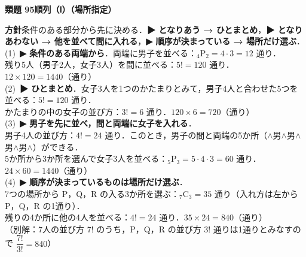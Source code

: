 \documentclass[a4paper,11pt]{ltjsarticle}
\newcommand{\ans}[2]{\Needspace{5\baselineskip}\vspace{6pt}%
  {\sffamily\bfseries 類題 #1\quad #2}\par}
\newcommand{\point}[1]{\textsf{\bfseries ▶ #1}}
\begin{document}
\ans{95}{順列（Ⅰ）（場所指定）}
\begin{kai}
\textbf{方針}\quad 条件のある部分から先に決める．\point{となりあう → ひとまとめ}，\point{となりあわない → 他を並べて間に入れる}，\point{順序が決まっている → 場所だけ選ぶ}．\\[2pt]
(1)\ \point{条件のある両端から}．両端に男子を並べる：${}_4\mathrm P_2=4\cdot3=12$ 通り．\\
\hspace*{1.5em}残り5人（男子2人，女子3人）を間に並べる：$5!=120$ 通り．\\
\hspace*{1.5em}$12\times120=1440$（通り）\\[2pt]
(2)\ \point{ひとまとめ}．女子3人を1つのかたまりとみて，男子4人と合わせた5つを並べる：$5!=120$ 通り．\\
\hspace*{1.5em}かたまりの中の女子の並び方：$3!=6$ 通り．\quad $120\times6=720$（通り）\\[2pt]
(3)\ \point{男子を先に並べ，間と両端に女子を入れる}．\\
\hspace*{1.5em}男子4人の並び方：$4!=24$ 通り．このとき，男子の間と両端の5か所（$\wedge$男$\wedge$男$\wedge$男$\wedge$男$\wedge$）ができる．\\
\hspace*{1.5em}5か所から3か所を選んで女子3人を並べる：${}_5\mathrm P_3=5\cdot4\cdot3=60$ 通り．\\
\hspace*{1.5em}$24\times60=1440$（通り）\\[2pt]
(4)\ \point{順序が決まっているものは場所だけ選ぶ}．\\
\hspace*{1.5em}7つの場所から P，Q，R の入る3か所を選ぶ：${}_7\mathrm C_3=35$ 通り（入れ方は左から P，Q，R の1通り）．\\
\hspace*{1.5em}残りの4か所に他の4人を並べる：$4!=24$ 通り．\quad $35\times24=840$（通り）\\
\hspace*{1.5em}（別解：7人の並び方 $7!$ のうち，P，Q，R の並び方 $3!$ 通りは1通りとみなすので $\dfrac{7!}{3!}=840$）
\end{kai}
\end{document}
